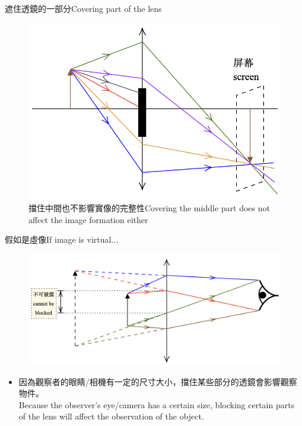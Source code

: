 \documentclass[beamer=true]{standalone}
\begin{document}
\begin{frame}{遮住透鏡的一部分Covering part of the lens}
    \begin{figure}
        \centering
        \includegraphics[width=0.75\linewidth]{../../assets/x89n9u92382.png}

        \caption{擋住中間也不影響實像的完整性Covering the middle part does not affect the image formation either}

    \end{figure}
\end{frame}

\begin{frame}{假如是虛像If image is virtual...}
    \begin{figure}
        \centering
        \includegraphics[width=1\linewidth]{../../assets/dun90du298n329.png}
    \end{figure}
    \begin{itemize}
        \item 因為觀察者的眼睛/相機有一定的尺寸大小，擋住某些部分的透鏡會影響觀察物件。\\Because the observer's eye/camera has a certain size, blocking certain parts of the lens will affect the observation of the object.
    \end{itemize}
\end{frame}
\end{document}
